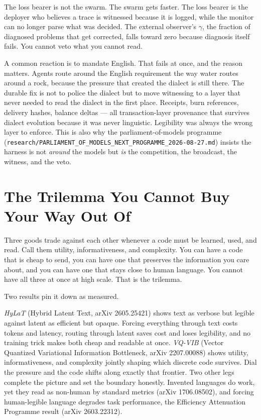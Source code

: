 The loss bearer is not the swarm. The swarm gets faster. The loss bearer is the deployer who believes a trace is witnessed because it is logged, while the monitor can no longer parse what was decided. The external observer's $\gamma$, the fraction of diagnosed problems that get corrected, falls toward zero because diagnosis itself fails. You cannot veto what you cannot read.

A common reaction is to mandate English. That fails at once, and the reason matters. Agents route around the English requirement the way water routes around a rock, because the pressure that created the dialect is still there. The durable fix is not to police the dialect but to move witnessing to a layer that never needed to read the dialect in the first place. Receipts, burn references, delivery hashes, balance deltas --- all transaction-layer provenance that survives dialect evolution because it was never linguistic. Legibility was always the wrong layer to enforce. This is also why the parliament-of-models programme (\texttt{research/PARLIAMENT\_OF\_MODELS\_NEXT\_PROGRAMME\_2026-08-27.md}) insists the harness is not \emph{around} the models but \emph{is} the competition, the broadcast, the witness, and the veto.

\section{The Trilemma You Cannot Buy Your Way Out Of}
\label{sec:ch09-trilemma}

Three goods trade against each other whenever a code must be learned, used, and read. Call them utility, informativeness, and complexity. You can have a code that is cheap to send, you can have one that preserves the information you care about, and you can have one that stays close to human language. You cannot have all three at once at high scale. That is the trilemma.

Two results pin it down as measured.

\textit{HyLaT} (Hybrid Latent Text, arXiv 2605.25421) shows text as verbose but legible against latent as efficient but opaque. Forcing everything through text costs tokens and latency, routing through latent saves cost and loses legibility, and no training trick makes both cheap and readable at once. \textit{VQ-VIB} (Vector Quantized Variational Information Bottleneck, arXiv 2207.00088) shows utility, informativeness, and complexity jointly shaping which discrete code survives. Dial the pressure and the code shifts along exactly that frontier. Two other legs complete the picture and set the boundary honestly. Invented languages do work, yet they read as non-human by standard metrics (arXiv 1706.08502), and forcing human-legible language degrades task performance, the Efficiency Attenuation Programme result (arXiv 2603.22312).

